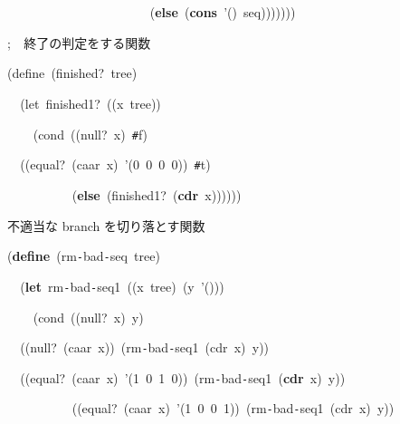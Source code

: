 \documentclass[a4paper,10pt]{article}
\def\mc{\relax}
\begin{document}
\noindent
\mbox{}{\tt\mc \ }{\tt\mc \ }{\tt\mc \ }{\tt\mc \ }{\tt\mc \ }{\tt\mc \ }{\tt\mc \ }{\tt\mc \ }{\tt\mc \ }{\tt\mc \ }{\tt\mc \ }{\tt\mc \ }{\tt\mc \ }{\tt\mc \ }{\tt\mc \ }{\tt\mc \ }{\tt\mc \ }{\tt\mc \ }{\tt\mc \ }{\tt\mc \ }{\tt\mc \ }{\tt\mc \ }(\textbf{else}{\tt\mc \ }(\textbf{cons}{\tt\mc \ }'(){\tt\mc \ }seq)))))))

\noindent
\mbox{}\hfill

\noindent
\mbox{};{\tt\mc \ }{\tt\mc \ }終了の判定をする関数

\noindent
\mbox{}(define{\tt\mc \ }(finished?{\tt\mc \ }tree)

\noindent
\mbox{}{\tt\mc \ }{\tt\mc \ }(let{\tt\mc \ }finished1?{\tt\mc \ }((x{\tt\mc \ }tree))

\noindent
\mbox{}{\tt\mc \ }{\tt\mc \ }{\tt\mc \ }{\tt\mc \ }(cond{\tt\mc \ }((null?{\tt\mc \ }x){\tt\mc \ }{\tt\#}f)

\noindent
\mbox{}{\tt\mc \ }{\tt\mc \ }((equal?{\tt\mc \ }(caar{\tt\mc \ }x){\tt\mc \ }'(0{\tt\mc \ }0{\tt\mc \ }0{\tt\mc \ }0)){\tt\mc \ }{\tt\#}t)

\noindent
\mbox{}{\tt\mc \ }{\tt\mc \ }{\tt\mc \ }{\tt\mc \ }{\tt\mc \ }{\tt\mc \ }{\tt\mc \ }{\tt\mc \ }{\tt\mc \ }{\tt\mc \ }(\textbf{else}{\tt\mc \ }(finished1?{\tt\mc \ }(\textbf{cdr}{\tt\mc \ }x))))))

\noindent
\mbox{}\hfill

\noindent
\mbox{}\rm\mc {\tt ;}  不適当な branch を切り落とす関数
\tt\mc 

\noindent
\mbox{}(\textbf{define}{\tt\mc \ }(rm{\tt -}bad{\tt -}seq{\tt\mc \ }tree)

\noindent
\mbox{}{\tt\mc \ }{\tt\mc \ }(\textbf{let}{\tt\mc \ }rm{\tt -}bad{\tt -}seq1{\tt\mc \ }((x{\tt\mc \ }tree){\tt\mc \ }(y{\tt\mc \ }'()))

\noindent
\mbox{}{\tt\mc \ }{\tt\mc \ }{\tt\mc \ }{\tt\mc \ }(cond{\tt\mc \ }((null?{\tt\mc \ }x){\tt\mc \ }y)

\noindent
\mbox{}{\tt\mc \ }{\tt\mc \ }((null?{\tt\mc \ }(caar{\tt\mc \ }x)){\tt\mc \ }(rm{\tt -}bad{\tt -}seq1{\tt\mc \ }(cdr{\tt\mc \ }x){\tt\mc \ }y))

\noindent
\mbox{}{\tt\mc \ }{\tt\mc \ }((equal?{\tt\mc \ }(caar{\tt\mc \ }x){\tt\mc \ }'(1{\tt\mc \ }0{\tt\mc \ }1{\tt\mc \ }0)){\tt\mc \ }(rm{\tt -}bad{\tt -}seq1{\tt\mc \ }(\textbf{cdr}{\tt\mc \ }x){\tt\mc \ }y))

\noindent
\mbox{}{\tt\mc \ }{\tt\mc \ }{\tt\mc \ }{\tt\mc \ }{\tt\mc \ }{\tt\mc \ }{\tt\mc \ }{\tt\mc \ }{\tt\mc \ }{\tt\mc \ }((equal?{\tt\mc \ }(caar{\tt\mc \ }x){\tt\mc \ }'(1{\tt\mc \ }0{\tt\mc \ }0{\tt\mc \ }1)){\tt\mc \ }(rm{\tt -}bad{\tt -}seq1{\tt\mc \ }(cdr{\tt\mc \ }x){\tt\mc \ }y))
\end{document}
